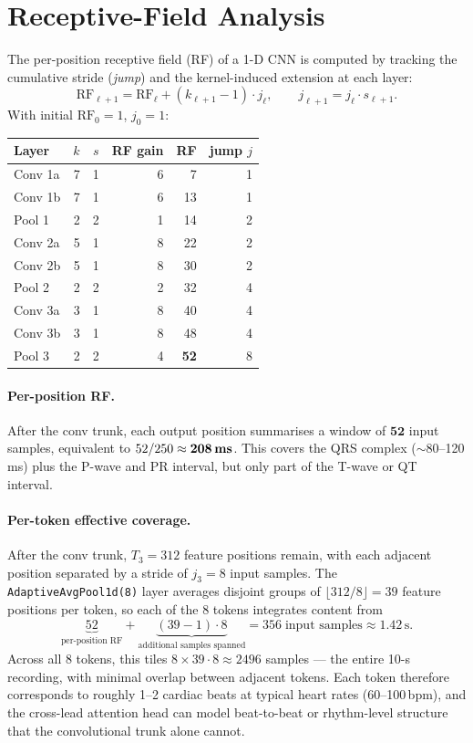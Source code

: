 \documentclass[11pt]{article}
\begin{document}
\section{Receptive-Field Analysis}

The per-position receptive field (RF) of a 1-D CNN is computed by tracking the
cumulative stride (\emph{jump}) and the kernel-induced extension at each layer:
%
\[
  \text{RF}_{\ell+1} = \text{RF}_\ell + (k_{\ell+1} - 1) \cdot j_\ell,
  \qquad
  j_{\ell+1} = j_\ell \cdot s_{\ell+1}.
\]
%
With initial $\text{RF}_0 = 1$, $j_0 = 1$:

\begin{center}
\begin{tabular}{lrrrrr}
\toprule
Layer & $k$ & $s$ & RF gain & RF & jump $j$ \\
\midrule
Conv 1a & 7 & 1 & 6 & 7  & 1 \\
Conv 1b & 7 & 1 & 6 & 13 & 1 \\
Pool 1  & 2 & 2 & 1 & 14 & 2 \\
Conv 2a & 5 & 1 & 8 & 22 & 2 \\
Conv 2b & 5 & 1 & 8 & 30 & 2 \\
Pool 2  & 2 & 2 & 2 & 32 & 4 \\
Conv 3a & 3 & 1 & 8 & 40 & 4 \\
Conv 3b & 3 & 1 & 8 & 48 & 4 \\
Pool 3  & 2 & 2 & 4 & \textbf{52} & 8 \\
\bottomrule
\end{tabular}
\end{center}

\paragraph{Per-position RF.}
After the conv trunk, each output position summarises a window of
$\textbf{52}$ input samples, equivalent to $52 / 250 \approx \textbf{208\,ms}$.
This covers the QRS complex ($\sim$80--120\,ms) plus the P-wave and PR
interval, but only part of the T-wave or QT interval.

\paragraph{Per-token effective coverage.}
After the conv trunk, $T_3 = 312$ feature positions remain, with each adjacent
position separated by a stride of $j_3 = 8$ input samples. The
\texttt{AdaptiveAvgPool1d(8)} layer averages disjoint groups of
$\lfloor 312 / 8 \rfloor = 39$ feature positions per token, so each of the 8
tokens integrates content from
%
\[
  \underbrace{52}_{\text{per-position RF}}
  + \underbrace{(39 - 1) \cdot 8}_{\text{additional samples spanned}}
  = 356 \;\text{input samples} \approx 1.42\,\text{s}.
\]
%
Across all 8 tokens, this tiles $8 \times 39 \cdot 8 \approx 2496$ samples ---
the entire 10-s recording, with minimal overlap between adjacent tokens. Each
token therefore corresponds to roughly 1--2 cardiac beats at typical heart
rates (60--100\,bpm), and the cross-lead attention head can model beat-to-beat
or rhythm-level structure that the convolutional trunk alone cannot.
\end{document}
